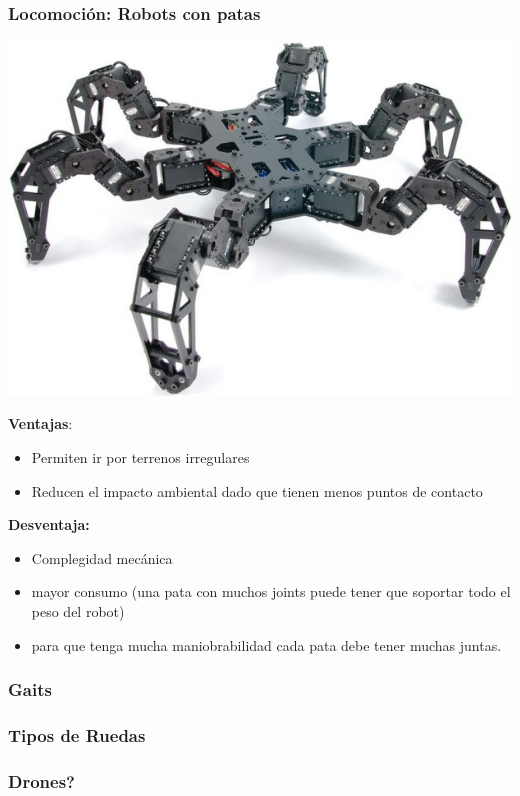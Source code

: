 \begin{frame}
    \frametitle{Locomoción: Robots con patas}

    \begin{center}
        \includegraphics[width=0.4\columnwidth]{images/hexapod_phantomX_mark_II.jpg}
    \end{center}
    \footnotesize
    {\bf Ventajas}:
    \begin{itemize}
        \item Permiten ir por terrenos irregulares
        \item Reducen el impacto ambiental dado que tienen menos puntos de contacto
    \end{itemize}
    {\bf Desventaja: }
    \begin{itemize}
        \item Complegidad mecánica
        \item mayor consumo (una pata con muchos joints puede tener que soportar todo el peso del robot)
        \item para que tenga mucha maniobrabilidad cada pata debe tener muchas juntas.
\end{itemize}

\end{frame}


\begin{frame}
    \frametitle{Gaits}

\end{frame}


\begin{frame}
    \frametitle{Tipos de Ruedas}

\end{frame}

\begin{frame}
    \frametitle{Drones?}

\end{frame}